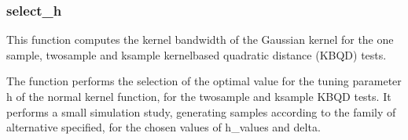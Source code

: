 \documentclass[letterpaper,10pt,english,openany,oneside]{sphinxmanual}
\begin{document}
\subsubsection{select\_h}
\label{\detokenize{api_reference/generated/QuadratiK.kernel_test.select_h:select-h}}\label{\detokenize{api_reference/generated/QuadratiK.kernel_test.select_h::doc}}

\begin{fulllineitems}
\label{\detokenize{api_reference/generated/QuadratiK.kernel_test.select_h:QuadratiK.kernel_test.select_h}}
\pysigstartsignatures
{}
\pysigstopsignatures
\sphinxAtStartPar
This function computes the kernel bandwidth of the Gaussian kernel for the 
one sample, two\sphinxhyphen{}sample and k\sphinxhyphen{}sample kernel\sphinxhyphen{}based quadratic distance (KBQD) tests.

\sphinxAtStartPar
The function performs the selection of the optimal value for the tuning parameter h of the normal
kernel function, for the two\sphinxhyphen{}sample and k\sphinxhyphen{}sample KBQD tests. It performs a small simulation
study, generating samples according to the family of alternative specified, for the chosen values
of h\_values and delta.



\end{fulllineitems}
\end{document}
